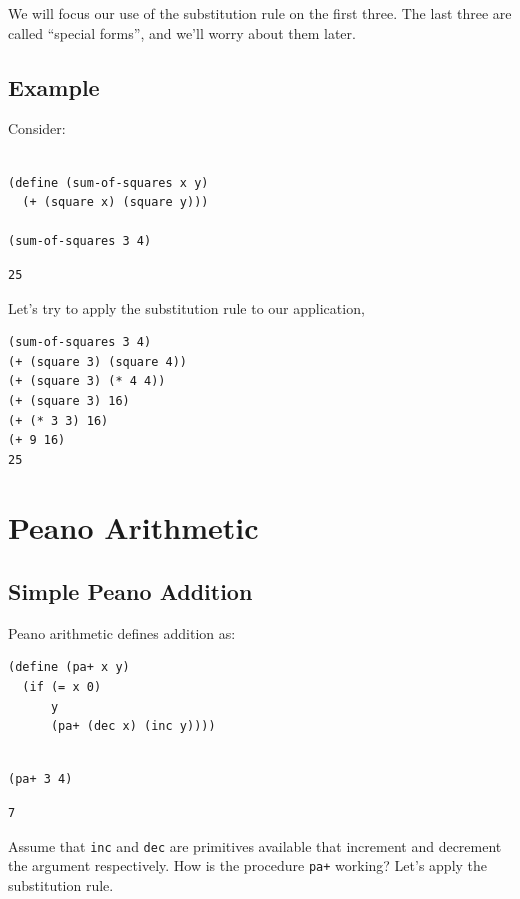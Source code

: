 \documentclass[9pt]{report}
\begin{document}
We will focus our use of the substitution rule on the first three.
The last three are called ``special forms'', and we'll worry about
them later.

\subsection{Example}
\label{sec:org41c865b}

Consider:

\begin{verbatim}

(define (sum-of-squares x y)
  (+ (square x) (square y)))

(sum-of-squares 3 4)
\end{verbatim}

\begin{verbatim}
25
\end{verbatim}


Let's try to apply the substitution rule to our application,

\begin{verbatim}
(sum-of-squares 3 4)
(+ (square 3) (square 4))
(+ (square 3) (* 4 4))
(+ (square 3) 16)
(+ (* 3 3) 16)
(+ 9 16)
25
\end{verbatim}

\section{Peano Arithmetic}
\label{sec:org89f16f1}

\subsection{Simple Peano Addition}
\label{sec:org61b6a50}
Peano arithmetic defines addition as:

\begin{verbatim}
(define (pa+ x y)
  (if (= x 0)
      y
      (pa+ (dec x) (inc y))))
\end{verbatim}

\begin{verbatim}

(pa+ 3 4)
\end{verbatim}

\begin{verbatim}
7
\end{verbatim}


Assume that \texttt{inc} and \texttt{dec} are primitives available that increment
and decrement the argument respectively. How is the procedure \texttt{pa+}
working? Let's apply the substitution rule.
\end{document}
